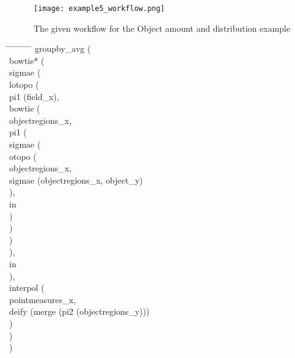 \documentclass{article}
\begin{document}
\begin{sidewaysfigure}
        \texttt{[image: example5\_workflow.png]}
    \caption{The given workflow for the Object amount and distribution example }
    \label{figure:fieldamount2workflow}
\end{sidewaysfigure}



\begin{tabbing}
\hspace{0.5cm}     \= \hspace{0.5cm}  \= \hspace{0.5cm}  \= \hspace{0.5cm}  \=\hspace{0.5cm}  \=\hspace{0.5cm} \= \hspace{0.5cm}  \= \hspace{0.5cm} \= \hspace{0.5cm} \= \hspace{0.5cm}\kill
groupby\_avg (\\
\>bowtie* (\\
\>\>sigmae (\\
\>\>\>lotopo (\\
\>\>\>\>pi1 (field\_x),\\
\>\>\>\>bowtie (\\
\>\>\>\>\>objectregions\_x, \\
\>\>\>\>\>pi1 (\\
\>\>\>\>\>\>sigmae (\\
\>\>\>\>\>\>\>\>otopo (\\
\>\>\>\>\>\>\>\>\>objectregions\_x, \\
\>\>\>\>\>\>\>\>\>sigmae (objectregions\_x, object\_y)\\
\>\>\>\>\>\>\>\>), \\
\>\>\>\>\>\>\>in\\
\>\>\>\>\>\>)\\
\>\>\>\>\>) \\
\>\>\>\>)\\
\>\>\>),\\
\>\>\>in\\
\>\>),\\
\>\>interpol (\\
\>\>\>pointmeasures\_x, \\
\>\>\>deify (merge (pi2 (objectregions\_y)))\\
\>\>)\\
\>)\\
)
\end{tabbing}
\end{document}
